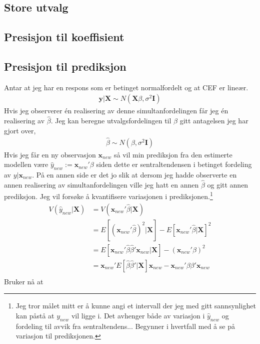 \subsection{Store utvalg}
\subsection{Presisjon til koeffisient}
\subsection{Presisjon til prediksjon}
Antar at jeg har en respons som er betinget normalfordelt og at CEF er lineær.
\begin{align}
\mathbf{y}|\mathbf{X} \sim N(\mathbf{X}\beta,\sigma^2\mathbf{I})
\end{align}
Hvis jeg observerer én realisering av denne simultanfordelingen får jeg én realisering av $\hat{\beta}$.    Jeg kan beregne utvalgsfordelingen til $\hat{\beta}$ gitt antagelsen jeg har gjort over,
\begin{align}
\hat{\beta} \sim N(\beta,\sigma^2\mathbf{I})
\end{align}
Hvis jeg får en ny observasjon $\mathbf{x}_{new}$ så vil min prediksjon fra den estimerte modellen være $\hat{y}_{new} := \mathbf{x}_{new}'\beta$ siden dette er sentraltendensen i betinget fordeling av $y|\mathbf{x}_{new}$. På en annen side er det jo slik at dersom jeg hadde observerte en annen realisering av simultanfordelingen ville jeg hatt en annen $\hat{\beta}$ og gitt annen prediksjon. Jeg vil forsøke å kvantifisere variasjonen i prediksjonen.\footnote{Jeg tror målet mitt er å kunne angi et intervall der jeg med gitt sannsynlighet kan påstå at $y_{new}$ vil ligge i. Det avhenger både av variasjon i $\hat{y}_{new}$ og fordeling til avvik fra sentraltendens... Begynner i hvertfall med å se på variasjon til prediksjonen.}
\begin{align}
V(\hat{y}_{new}|\mathbf{X}) &= V(\mathbf{x}_{new}'\hat{\beta}|\mathbf{X}) \\
&= E[(\mathbf{x}_{new}'\hat{\beta})^2|\mathbf{X}] - E[\mathbf{x}_{new}'\hat{\beta}|\mathbf{X}]^2 \\
&= E[\mathbf{x}_{new}'\hat{\beta}\hat{\beta}'\mathbf{x}_{new}|\mathbf{X}] - (\mathbf{x}_{new}'\beta)^2 \\
&= \mathbf{x}_{new}'E[\hat{\beta}\hat{\beta}'|\mathbf{X}]\mathbf{x}_{new} - \mathbf{x}_{new}'\beta\beta'\mathbf{x}_{new} \\
\end{align}
Bruker nå at 
